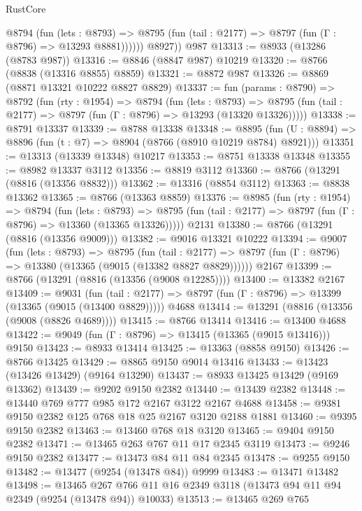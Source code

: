 \begin{lexlean}{RustCore}
\begin{coremodule}
            @8794
              (fun (lets : @8793) =>
              @8795 (fun (tail : @2177) => @8797 (fun (Γ : @8796) => @13293 @8881))))))
        @8927))
    @987
@13313 := @8933 (@13286 (@8783 @987))
@13316 := @8846 (@8847 @987) @10219
@13320 := @8766 (@8838 (@13316 @8855) @8859)
@13321 := @8872 @987
@13326 := @8869 (@8871 @13321 @10222 @8827 @8829)
@13337 := fun (params : @8790) =>
  @8792
    (fun (rty : @1954) =>
    @8794
      (fun (lets : @8793) =>
      @8795 (fun (tail : @2177) => @8797 (fun (Γ : @8796) => @13293 (@13320 @13326)))))
@13338 := @8791 @13337
@13339 := @8788 @13338
@13348 := @8895
    (fun (U : @8894) => @8896 (fun (t : @7) => @8904 (@8766 (@8910 @10219 @8784) @8921)))
@13351 := @13313 (@13339 @13348) @10217
@13353 := @8751 @13338 @13348
@13355 := @8982 @13337 @3112
@13356 := @8819 @3112
@13360 := @8766 (@13291 (@8816 (@13356 @8832)))
@13362 := @13316 (@8854 @3112)
@13363 := @8838 @13362
@13365 := @8766 (@13363 @8859)
@13376 := @8985
    (fun (rty : @1954) =>
    @8794
      (fun (lets : @8793) =>
      @8795 (fun (tail : @2177) => @8797 (fun (Γ : @8796) => @13360 (@13365 @13326)))))
    @2131
@13380 := @8766 (@13291 (@8816 (@13356 @9009)))
@13382 := @9016 @13321 @10222
@13394 := @9007
    (fun (lets : @8793) =>
    @8795
      (fun (tail : @2177) =>
      @8797 (fun (Γ : @8796) => @13380 (@13365 (@9015 (@13382 @8827 @8829))))))
    @2167
@13399 := @8766 (@13291 (@8816 (@13356 (@9008 @12285))))
@13400 := @13382 @2167
@13409 := @9031
    (fun (tail : @2177) => @8797 (fun (Γ : @8796) => @13399 (@13365 (@9015 (@13400 @8829)))))
    @4688
@13414 := @13291 (@8816 (@13356 (@9008 (@8826 @4689))))
@13415 := @8766 @13414
@13416 := @13400 @4688
@13422 := @9049 (fun (Γ : @8796) => @13415 (@13365 (@9015 @13416))) @9150
@13423 := @8933 @13414
@13425 := @13363 (@8858 @9150)
@13426 := @8766 @13425
@13429 := @8865 @9150 @9014 @13416
@13433 := @13423 (@13426 @13429) (@9164 @13290)
@13437 := @8933 @13425 @13429 (@9169 @13362)
@13439 := @9202 @9150 @2382
@13440 := @13439 @2382
@13448 := @13440 @769 @777 @985 @172 @2167 @3122 @2167 @4688
@13458 := @9381 @9150 @2382 @125 @768 @18 @25 @2167 @3120 @2188 @1881
@13460 := @9395 @9150 @2382
@13463 := @13460 @768 @18 @3120
@13465 := @9404 @9150 @2382
@13471 := @13465 @263 @767 @11 @17 @2345 @3119
@13473 := @9246 @9150 @2382
@13477 := @13473 @84 @11 @84 @2345
@13478 := @9255 @9150
@13482 := @13477 (@9254 (@13478 @84)) @9999
@13483 := @13471 @13482
@13498 := @13465
    @267
    @766
    @11
    @16
    @2349
    @3118
    (@13473 @94 @11 @94 @2349 (@9254 (@13478 @94)) @10033)
@13513 := @13465
    @269
    @765

\end{coremodule}
\end{lexlean}
